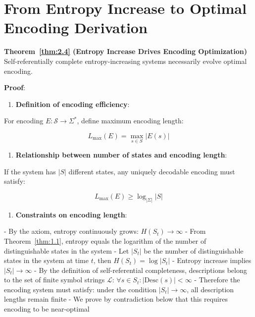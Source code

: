 \section{From Entropy Increase to Optimal Encoding Derivation}
\label{sec:ch04_encoding:from-entropy-increase-to-optimal-encoding-derivation}

\textbf{Theorem~\ref{thm:2.4} (Entropy Increase Drives Encoding Optimization)}
\label{thm:2.4}
Self-referentially complete entropy-increasing systems necessarily evolve optimal encoding.

\textbf{Proof}:

\begin{enumerate}
\item \textbf{Definition of encoding efficiency}:
\end{enumerate}
   For encoding $E: \mathcal{S} \to \Sigma^*$, define maximum encoding length:
   
\begin{equation}
L_{\max}(E) = \max_{s \in S} |E(s)|
\end{equation}

\begin{enumerate}
\item \textbf{Relationship between number of states and encoding length}:
\end{enumerate}
   If the system has $|S|$ different states, any uniquely decodable encoding must satisfy:
   
\begin{equation}
L_{\max}(E) \geq \log_{|\Sigma|} |S|
\end{equation}

\begin{enumerate}
\item \textbf{Constraints on encoding length}:
\end{enumerate}
   - By the axiom, entropy continuously grows: $H(S_t) \to \infty$
   - From Theorem~\ref{thm:1.1}, entropy equals the logarithm of the number of distinguishable states in the system
   - Let $|S_t|$ be the number of distinguishable states in the system at time $t$, then $H(S_t) = \log |S_t|$
   - Entropy increase implies $|S_t| \to \infty$
   - By the definition of self-referential completeness, descriptions belong to the set of finite symbol strings $\mathcal{L}$: $\forall s \in S_t: |\text{Desc}(s)| < \infty$
   - Therefore the encoding system must satisfy: under the condition $|S_t| \to \infty$, all description lengths remain finite
   - We prove by contradiction below that this requires encoding to be near-optimal
   

